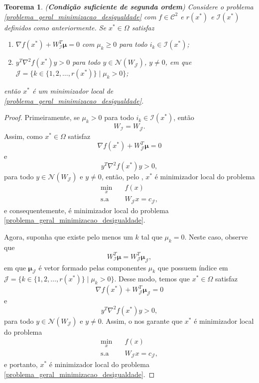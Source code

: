 \documentclass[12pt,a4paper]{scrartcl}
\newtheorem{teo}{Teorema}
\theoremstyle{definition}%
\begin{document}
\begin{teo}(\textbf{Condição suficiente de segunda ordem}) \label{teo:condicao_suficiente_2ordem_desigualdade}
Considere o problema \eqref{problema_geral_minimizacao_desigualdade} com $f \in \mathcal{C}^{2}$ e $r(x^{*})$ e $\mathcal{I}(x^{*})$ definidos como anteriormente. Se $x^{*} \in \Omega$ satisfaz 
\begin{enumerate}
	\item[(i)] $\nabla f(x^{*}) + W_{\mathcal{I}}^{T} \boldsymbol{\mu} =0$ com $\mu_{k} \geq 0$ para todo $i_{k} \in \mathcal{I}(x^{*})$; 
	\item[(ii)] $y^{T} \nabla^{2} f(x^{*})y > 0$ para todo $y \in \mathcal{N}(W_{\mathcal{J}})$, $y\neq 0$, em que $\mathcal{J} = \{ k\in \{ 1,2, \ldots , r(x^{*}) \} \mid \mu_{k} >0 \}$;
\end{enumerate}
então $x^{*}$ é um minimizador local de \eqref{problema_geral_minimizacao_desigualdade}.
\end{teo}
\begin{proof}
Primeiramente, se $\mu_{k} >0$ para todo $i_k \in \mathcal{I}(x^{*})$, então
\[
W_{\mathcal{I}} = W_{\mathcal{J}}.
\]
Assim, como $x^{*} \in \Omega$ satisfaz
\[
\nabla f(x^{*}) + W_{\mathcal{J}}^{T} \boldsymbol{\mu} =0
\]
e
\[
y^{T} \nabla^{2} f(x^{*})y > 0,
\]
para todo $y \in \mathcal{N}(W_{\mathcal{J}})$ e $y\neq 0$, então, pelo , $x^{*}$ é minimizador local do problema
\[ 
\begin{aligned}
\min_{x} & \quad f(x) \\
\text{s.a} & \quad W_{\mathcal{J}}x=c_{\mathcal{J}} ,
\end{aligned}
\]
e consequentemente, é minimizador local do problema \eqref{problema_geral_minimizacao_desigualdade}.

Agora, suponha que existe pelo menos um $k$ tal que $\mu_{k} =0$. Neste caso, observe que
\[
W_{\mathcal{I}}^{T} \boldsymbol{\mu} = W_{\mathcal{J}}^{T} \boldsymbol{\mu}_{\mathcal{J}},
\]
em que $\boldsymbol{\mu}_{\mathcal{J}}$ é vetor formado pelas componentes $\mu_{k}$ que possuem índice em $\mathcal{J} = \{ k\in \{ 1,2, \ldots , r(x^{*}) \} \mid \mu_{k} >0 \}$. Desse modo, temos que $x^{*} \in \Omega$ satisfaz
\[
\nabla f(x^{*}) + W_{\mathcal{J}}^{T} \boldsymbol{\mu}_{\mathcal{J}} =0
\]
e
\[
y^{T} \nabla^{2} f(x^{*})y > 0,
\]
para todo $y \in \mathcal{N}(W_{\mathcal{J}})$ e $y\neq 0$. Assim, o  nos garante que $x^{*}$ é minimizador local do problema
\[ 
\begin{aligned}
\min_{x} & \quad f(x) \\
\text{s.a} & \quad W_{\mathcal{J}}x=c_{\mathcal{J}} ,
\end{aligned}
\]
e portanto, $x^{*}$ é minimizador local do problema \eqref{problema_geral_minimizacao_desigualdade}.
\end{proof}
\end{document}
